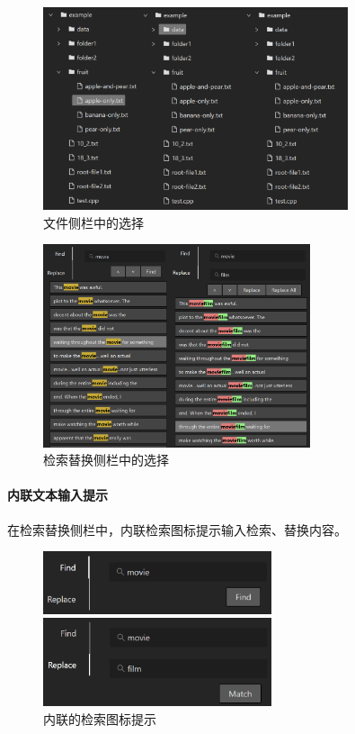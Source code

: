 \documentclass[scheme = chinese]{ctexart}
\begin{document}
\begin{figure}[h]
    \centering
    \includegraphics[width=0.8\textwidth]{images/细节-文件多选一或零.png}
    \caption{文件侧栏中的选择}
\end{figure}

\begin{figure}[h]
    \centering
    \includegraphics[width=0.7\textwidth]{images/细节-多选一.png}
    \caption{检索替换侧栏中的选择}
\end{figure}

\clearpage

\paragraph{内联文本输入提示}
在检索替换侧栏中，内联检索图标提示输入检索、替换内容。

\begin{figure}[h]
    \centering
    \includegraphics[width=0.6\textwidth]{images/细节-内联提示.png}
    \caption{内联的检索图标提示}
\end{figure}
\end{document}
